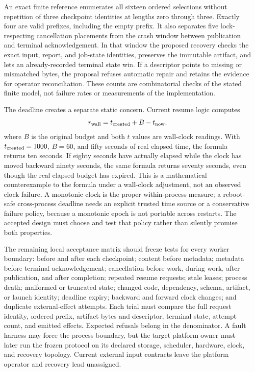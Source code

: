 An exact finite reference enumerates all sixteen ordered selections without
repetition of three checkpoint identities at lengths zero through three.
Exactly four are valid prefixes, including the empty prefix. It also separates
five lock-respecting cancellation placements from the crash window between
publication and terminal acknowledgement. In that window the proposed recovery
checks the exact input, report, and job-state identities, preserves the
immutable artifact, and lets an already-recorded terminal state win. If a
descriptor points to missing or mismatched bytes, the proposal refuses
automatic repair and retains the evidence for operator reconciliation. These
counts are combinatorial checks of the stated finite model, not failure rates
or measurements of the implementation.
\citep{exec17_continuity_reference}

The deadline creates a separate static concern. Current resume logic computes
\[
 r_{\rm wall}=t_{\rm created}+B-t_{\rm now},
\]
where $B$ is the original budget and both $t$ values are wall-clock readings.
With $t_{\rm created}=1000$, $B=60$, and fifty seconds of real elapsed time,
the formula returns ten seconds. If eighty seconds have actually elapsed while
the clock has moved backward ninety seconds, the same formula returns seventy
seconds, even though the real elapsed budget has expired. This is a
mathematical counterexample to the formula under a wall-clock adjustment, not
an observed clock failure. A monotonic clock is the proper within-process
measure; a reboot-safe cross-process deadline needs an explicit trusted time
source or a conservative failure policy, because a monotonic epoch is not
portable across restarts. The accepted design must choose and test that
policy rather than silently promise both properties.
\citep{exec14_failure_implementation,exec17_continuity_reference}

The remaining local acceptance matrix should freeze tests for every worker
boundary: before and after each checkpoint; content before metadata; metadata
before terminal acknowledgement; cancellation before work, during work,
after publication, and after completion; repeated resume requests; stale
leases; process death; malformed or truncated state; changed code, dependency,
schema, artifact, or launch identity; deadline expiry; backward and forward
clock changes; and duplicate external-effect attempts. Each trial must compare
the full request identity, ordered prefix, artifact bytes and descriptor,
terminal state, attempt count, and emitted effects. Expected refusals belong in
the denominator. A fault harness may force the process boundary, but the
target platform owner must later run the frozen protocol on its declared
storage, scheduler, hardware, clock, and recovery topology. Current external
input contracts leave the platform operator and recovery lead unassigned.
\citep{exec17_continuity_contract}


